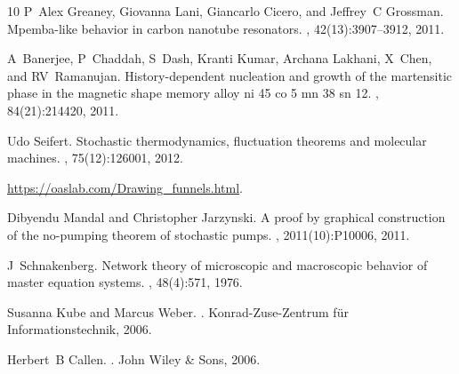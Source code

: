 \documentclass[a4paper,draft,aps,prl,preprint,superscriptaddress,nofootinbib]{revtex4}
\begin{document}
\begin{thebibliography}{10}
	P~Alex Greaney, Giovanna Lani, Giancarlo Cicero, and Jeffrey~C Grossman.
	\newblock Mpemba-like behavior in carbon nanotube resonators.
	, 42(13):3907--3912,
	2011.
	
	A~Banerjee, P~Chaddah, S~Dash, Kranti Kumar, Archana Lakhani, X~Chen, and
	RV~Ramanujan.
	\newblock History-dependent nucleation and growth of the martensitic phase in
	the magnetic shape memory alloy ni 45 co 5 mn 38 sn 12.
	, 84(21):214420, 2011.
	
	Udo Seifert.
	\newblock Stochastic thermodynamics, fluctuation theorems and molecular
	machines.
	, 75(12):126001, 2012.
	
	\url{https://oaslab.com/Drawing_funnels.html}.
	
	Dibyendu Mandal and Christopher Jarzynski.
	\newblock A proof by graphical construction of the no-pumping theorem of
	stochastic pumps.
	,
	2011(10):P10006, 2011.
	
	J~Schnakenberg.
	\newblock Network theory of microscopic and macroscopic behavior of master
	equation systems.
	, 48(4):571, 1976.
	
	Susanna Kube and Marcus Weber.
	.
	\newblock Konrad-Zuse-Zentrum f{\"u}r Informationstechnik, 2006.
	
	Herbert~B Callen.
	.
	\newblock John Wiley \& Sons, 2006.
	
\end{thebibliography}
		
\end{document}
